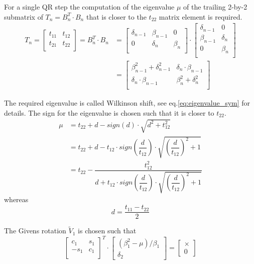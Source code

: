 For a single QR step the computation of the eigenvalue $\mu$ of the
trailing 2-by-2 submatrix of $T_n = B_n^T\cdot B_n$ that is closer to
the $t_{22}$ matrix element is required.
\begin{align}
T_n =
\begin{bmatrix}
t_{11} & t_{12}\\
t_{21} & t_{22}\\
\end{bmatrix}
= B_n^T\cdot B_n &=
\begin{bmatrix}
\delta_{n-1} & \beta_{n-1} & 0\\
0 & \delta_{n} & \beta_{n}\\
\end{bmatrix} \cdot
\begin{bmatrix}
\delta_{n-1} & 0\\
\beta_{n-1} & \delta_{n}\\
0 & \beta_{n}\\
\end{bmatrix}\\
&=
\begin{bmatrix}
\beta_{n-1}^2 + \delta_{n-1}^2 & \delta_{n}\cdot \beta_{n-1}\\
\delta_{n}\cdot \beta_{n-1} & \beta_{n}^2 + \delta_{n}^2\\
\end{bmatrix}
\end{align}

The required eigenvalue is called Wilkinson shift, see
eq.\eqref{eq:eigenvalue_sym} for details.  The sign for the eigenvalue
is chosen such that it is closer to $t_{22}$.
\begin{align}
\mu &= t_{22} + d - sign(d)\cdot \sqrt{d^2 + t_{12}^2}\\
&= t_{22} + d - t_{12}\cdot sign\left(\dfrac{d}{t_{12}}\right)\cdot \sqrt{\left(\dfrac{d}{t_{12}}\right)^2 + 1}\\
&= t_{22} - \dfrac{t_{12}^2}{d + t_{12}\cdot sign\left(\dfrac{d}{t_{12}}\right)\cdot \sqrt{\left(\dfrac{d}{t_{12}}\right)^2 + 1}}
\end{align}
whereas
\begin{equation}
d = \dfrac{t_{11} - t_{22}}{2}
\end{equation}

The Givens rotation $\tilde{V}_1$ is chosen such that
\begin{equation}
\begin{bmatrix}
c_1 & s_1\\
-s_1 & c_1\\
\end{bmatrix}^T
\cdot
\begin{bmatrix}
(\beta_1^2 - \mu) / \beta_1 \\
\delta_2
\end{bmatrix}
=
\begin{bmatrix}
\times\\
0
\end{bmatrix}
\end{equation}

